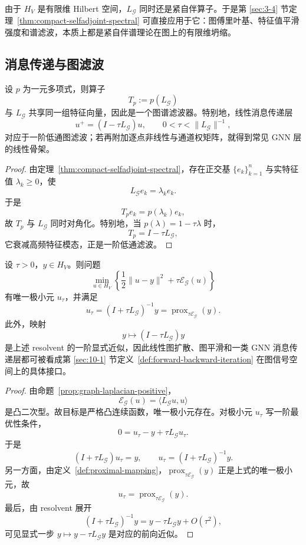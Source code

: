 \begin{remark}
由于 $H_V$ 是有限维 Hilbert 空间，$L_{\mathscr G}$ 同时还是紧自伴算子。于是第 \ref{sec:3-4} 节定理~\ref{thm:compact-selfadjoint-spectral} 可直接应用于它：图傅里叶基、特征值平滑强度和谱滤波，本质上都是紧自伴谱理论在图上的有限维坍缩。
\end{remark}

\subsection{消息传递与图滤波}

\begin{proposition}[消息传递是图滤波的一种线性原型]\label{prop:message-passing-graph-filter}
设 $p$ 为一元多项式，则算子
\[
T_p:=p(L_{\mathscr G})
\]
与 $L_{\mathscr G}$ 共享同一组特征向量，因此是一个图谱滤波器。特别地，线性消息传递层
\[
u^{+}=(I-\tau L_{\mathscr G})u,
\qquad 0<\tau<\|L_{\mathscr G}\|^{-1},
\]
对应于一阶低通图滤波；若再附加逐点非线性与通道权矩阵，就得到常见 GNN 层的线性骨架。
\end{proposition}

\begin{proof}
由定理~\ref{thm:compact-selfadjoint-spectral}，存在正交基 $\{e_k\}_{k=1}^n$ 与实特征值 $\lambda_k\ge 0$，使
\[
L_{\mathscr G}e_k=\lambda_k e_k.
\]
于是
\[
T_p e_k=p(\lambda_k)e_k,
\]
故 $T_p$ 与 $L_{\mathscr G}$ 同时对角化。特别地，当 $p(\lambda)=1-\tau\lambda$ 时，
\[
T_p=I-\tau L_{\mathscr G},
\]
它衰减高频特征模态，正是一阶低通滤波。
\end{proof}

\begin{theorem}[图扩散与学习接口]\label{thm:graph-diffusion-learning-interface}
设 $\tau>0$，$y\in H_V$。则问题
\[
\min_{u\in H_V}
\left\{
\frac12\|u-y\|^2+\tau \mathcal E_{\mathscr G}(u)
\right\}
\]
有唯一极小元 $u_\tau$，并满足
\[
u_\tau=(I+\tau L_{\mathscr G})^{-1}y=\operatorname{prox}_{\tau\mathcal E_{\mathscr G}}(y).
\]
此外，映射
\[
y\longmapsto (I-\tau L_{\mathscr G})y
\]
是上述 resolvent 的一阶显式近似，因此线性图扩散、图平滑和一类 GNN 消息传递层都可被看成第 \ref{sec:10-1} 节定义~\ref{def:forward-backward-iteration} 在图信号空间上的具体接口。
\end{theorem}

\begin{proof}
由命题~\ref{prop:graph-laplacian-positive}，
\[
\mathcal E_{\mathscr G}(u)=\langle L_{\mathscr G}u,u\rangle
\]
是凸二次型。故目标是严格凸连续函数，唯一极小元存在。对极小元 $u_\tau$ 写一阶最优性条件，
\[
0=u_\tau-y+\tau L_{\mathscr G}u_\tau.
\]
于是
\[
(I+\tau L_{\mathscr G})u_\tau=y,
\qquad
u_\tau=(I+\tau L_{\mathscr G})^{-1}y.
\]
另一方面，由定义~\ref{def:proximal-mapping}，$\operatorname{prox}_{\tau\mathcal E_{\mathscr G}}(y)$ 正是上式的唯一极小元，故
\[
u_\tau=\operatorname{prox}_{\tau\mathcal E_{\mathscr G}}(y).
\]
最后，由 resolvent 展开
\[
(I+\tau L_{\mathscr G})^{-1}y
=
y-\tau L_{\mathscr G}y+O(\tau^2),
\]
可见显式一步 $y\mapsto y-\tau L_{\mathscr G}y$ 是对应的前向近似。
\end{proof}

